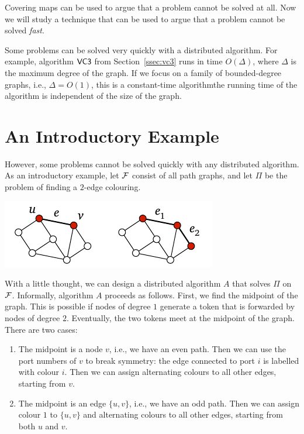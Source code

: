 
Covering maps can be used to argue that a problem cannot be solved at all. Now we will study a technique that can be used to argue that a problem cannot be solved \emph{fast}.

Some problems can be solved very quickly with a distributed algorithm. For example, algorithm $\textsf{VC3}$ from Section~\ref{ssec:vc3} runs in time $O(\Delta)$, where $\Delta$ is the maximum degree of the graph. If we focus on a family of bounded-degree graphs, i.e., $\Delta = O(1)$, this is a constant-time algorithm\mydash the running time of the algorithm is independent of the size of the graph.

\section{An Introductory Example}\label{sec:local-neighbourhood-example}

However, some problems cannot be solved quickly with any distributed algorithm. As an introductory example, let $\mathcal{F}$ consist of all path graphs, and let $\Pi$ be the problem of finding a $2$-edge colouring.
\begin{center}
    \includegraphics[page=\PTwoEdgeCol]{figs.pdf}
\end{center}

With a little thought, we can design a distributed algorithm $A$ that solves $\Pi$ on $\mathcal{F}$. Informally, algorithm $A$ proceeds as follows. First, we find the midpoint of the graph. This is possible if nodes of degree $1$ generate a token that is forwarded by nodes of degree $2$. Eventually, the two tokens meet at the midpoint of the graph. There are two cases:
\begin{enumerate}
    \item The midpoint is a node $v$, i.e., we have an even path. Then we can use the port numbers of $v$ to break symmetry: the edge connected to port $i$ is labelled with colour $i$. Then we can assign alternating colours to all other edges, starting from $v$.
    \item The midpoint is an edge $\{u,v\}$, i.e., we have an odd path. Then we can assign colour $1$ to $\{u,v\}$ and alternating colours to all other edges, starting from both $u$ and $v$.
\end{enumerate}

